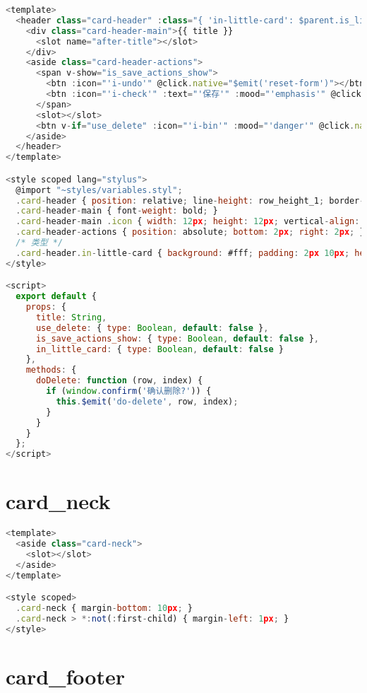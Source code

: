 \begin{lstlisting}[language=JavaScript]
<template>
  <header class="card-header" :class="{ 'in-little-card': $parent.is_little }">
    <div class="card-header-main">{{ title }}
      <slot name="after-title"></slot>
    </div>
    <aside class="card-header-actions">
      <span v-show="is_save_actions_show">
        <btn :icon="'i-undo'" @click.native="$emit('reset-form')"></btn>
        <btn :icon="'i-check'" :text="'保存'" :mood="'emphasis'" @click.native="$emit('save-form')"></btn>
      </span>
      <slot></slot>
      <btn v-if="use_delete" :icon="'i-bin'" :mood="'danger'" @click.native="doDelete"></btn>
    </aside>
  </header>
</template>

<style scoped lang="stylus">
  @import "~styles/variables.styl";
  .card-header { position: relative; line-height: row_height_1; border-bottom: 1px solid light_gray_1; margin-bottom: 10px; }
  .card-header-main { font-weight: bold; }
  .card-header-main .icon { width: 12px; height: 12px; vertical-align: -2px; margin-left: 5px; }
  .card-header-actions { position: absolute; bottom: 2px; right: 2px; }
  /* 类型 */
  .card-header.in-little-card { background: #fff; padding: 2px 10px; height: 26px; margin-bottom: 0; border: none; }
</style>

<script>
  export default {
    props: {
      title: String,
      use_delete: { type: Boolean, default: false },
      is_save_actions_show: { type: Boolean, default: false },
      in_little_card: { type: Boolean, default: false }
    },
    methods: {
      doDelete: function (row, index) {
        if (window.confirm('确认删除?')) {
          this.$emit('do-delete', row, index);
        }
      }
    }
  };
</script>

\end{lstlisting}


\section{card\_neck}


\begin{lstlisting}[language=JavaScript]
<template>
  <aside class="card-neck">
    <slot></slot>
  </aside>
</template>

<style scoped>
  .card-neck { margin-bottom: 10px; }
  .card-neck > *:not(:first-child) { margin-left: 1px; }
</style>
\end{lstlisting}


\section{card\_footer}


